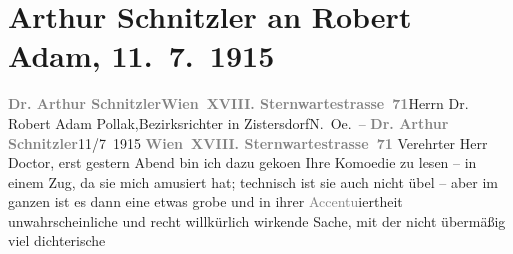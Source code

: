 

         
         \renewcommand{\erwaehntePersonen}{Personen: Robert Adam}
         \renewcommand{\erwaehnteOrte}{Orte: Kammerspiele Wien, Neue Wiener Bühne, Niederösterreich, Sternwartestraße, Wien, Zistersdorf}
         \renewcommand{\erwaehnteWerke}{Werke: Gesellschaft [Eine Gaunerkomödie]}
               \section[Arthur Schnitzler an Robert Adam, 11. 7. 1915]{ Arthur Schnitzler an Robert Adam, 11. 7. 1915}\nopagebreak{}\rehead{ }\begin{ledgroupsized}[t]{13cm}\normalsize\beginnumbering{} \toendnotes[C]{\smallbreak\pagebreak[2]} 
\toendnotes[C]{\smallbreak}\pstart{}{\pb}\textcolor{gray}{\textbf{Dr. Arthur Schnitzler}}\pend{}\pstart{}\textcolor{gray}{\textbf{Wien XVIII. Sternwartestrasse 71}}\pend{}{\bigskip}\pstart{}{\pb}Herrn Dr. Robert Adam Pollak,\pend{}\pstart{}Bezirksrichter in Zistersdorf\pend{}\pstart{}N. Oe. – \pend{}{\bigskip}\pstart
           \noindent{}{\pb}\textcolor{gray}{\textbf{Dr. Arthur Schnitzler}}\hfill 11/7 1915\pend
           \pstart
           \textcolor{gray}{\textbf{Wien XVIII. Sternwartestrasse 71}}\pend
           \pstart
           Verehrter Herr Doctor, erst gestern Abend bin ich dazu geko{\geminationm}en Ihre Komoedie zu lesen – in einem Zug, da sie mich amusiert hat;
               technisch ist sie auch nicht übel – aber im ganzen ist es dann eine etwas grobe und
               in ihrer \textcolor{gray}{Accentu}iertheit unwahrscheinliche und recht willkürlich
               wirkende Sache, mit der nicht übermäßig \introOben{}viel\introOben{} dichterische

\end{ledgroupsized}
